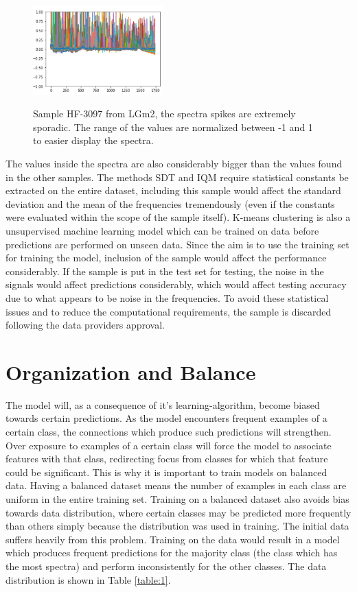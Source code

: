 \begin{figure}[H]

    \centering
{\includegraphics[width=5cm]{images/HF_3097.JPG} }
\caption{Sample HF-3097 from LGm2, the spectra spikes are extremely sporadic. The range of the values are normalized between -1 and 1 to easier display the spectra.\label{fig:HF3097}}%

\end{figure}

The values inside the spectra are also considerably bigger than the values found in the other samples. The methods SDT and IQM require statistical constants be extracted on the entire dataset, including this sample would affect the standard deviation and the mean of the frequencies tremendously (even if the constants were evaluated within the scope of the sample itself). K-means clustering is also a unsupervised machine learning model which can be trained on data before predictions are performed on unseen data. Since the aim is to use the training set  for training the model, inclusion of the sample would affect the performance considerably. If the sample is put in the test set for testing, the noise in the signals would affect predictions considerably, which would affect testing accuracy due to what appears to be noise in the frequencies. To avoid these statistical issues and to reduce the computational requirements, the sample is discarded following the data providers approval.

\section{Organization and Balance}
The model will, as a consequence of it's learning-algorithm, become biased towards certain predictions. As the model encounters frequent examples of a certain class, the connections which produce such predictions will strengthen. Over exposure to examples of a certain class will force the model to associate features with that class, redirecting focus from classes for which that feature could be significant. This is why it is important to train models on balanced data. Having a balanced dataset means the number of examples in each class are uniform in the entire training set. Training on a balanced dataset also avoids bias towards data distribution, where certain classes may be predicted more frequently than others simply because the distribution was used in training. The initial data suffers heavily from this problem. Training on the data would result in a model which produces frequent predictions for the majority class (the class which has the most spectra) and perform inconsistently for the other classes. The data distribution is shown in Table \ref{table:1}.

